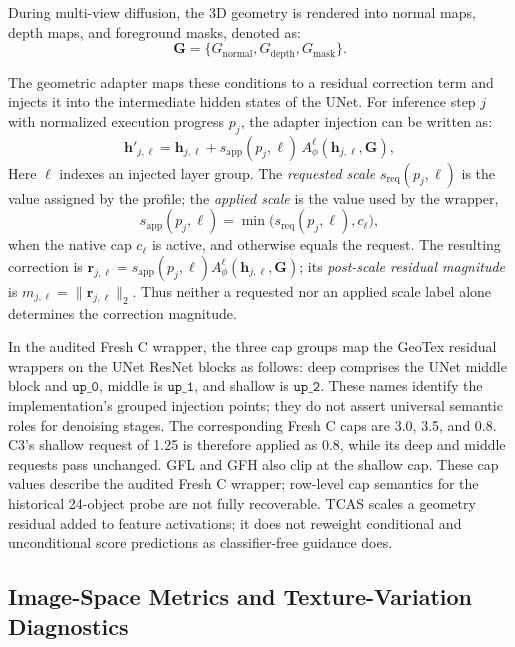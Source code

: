 \documentclass[times,twocolumn,final]{elsarticle}
\begin{document}
During multi-view diffusion, the 3D geometry is rendered into normal maps, depth maps, and foreground masks, denoted as:
\begin{equation}
\mathbf{G} = \{G_\text{normal}, G_\text{depth}, G_\text{mask}\}.
\end{equation}

The geometric adapter maps these conditions to a residual correction term and injects it into the intermediate hidden states of the UNet. For inference step $j$ with normalized execution progress $p_j$, the adapter injection can be written as:
\begin{equation}
\mathbf{h}'_{j,\ell} = \mathbf{h}_{j,\ell} + s_{\mathrm{app}}(p_j,\ell)\, A^\ell_\phi(\mathbf{h}_{j,\ell}, \mathbf{G}),
\label{eq:injection}
\end{equation}
Here $\ell$ indexes an injected layer group. The \emph{requested scale} $s_{\mathrm{req}}(p_j,\ell)$ is the value assigned by the profile; the \emph{applied scale} is the value used by the wrapper,
\begin{equation}
s_{\mathrm{app}}(p_j,\ell)=\min\!\bigl(s_{\mathrm{req}}(p_j,\ell),c_\ell\bigr),
\end{equation}
when the native cap $c_\ell$ is active, and otherwise equals the request. The resulting correction is $\mathbf{r}_{j,\ell}=s_{\mathrm{app}}(p_j,\ell)A^\ell_\phi(\mathbf{h}_{j,\ell},\mathbf{G})$; its \emph{post-scale residual magnitude} is $m_{j,\ell}=\|\mathbf{r}_{j,\ell}\|_2$. Thus neither a requested nor an applied scale label alone determines the correction magnitude.

In the audited Fresh C wrapper, the three cap groups map the GeoTex residual wrappers on the UNet ResNet blocks as follows: deep comprises the UNet middle block and $\texttt{up\_0}$, middle is $\texttt{up\_1}$, and shallow is $\texttt{up\_2}$. These names identify the implementation's grouped injection points; they do not assert universal semantic roles for denoising stages. The corresponding Fresh C caps are 3.0, 3.5, and 0.8. C3's shallow request of 1.25 is therefore applied as 0.8, while its deep and middle requests pass unchanged. GFL and GFH also clip at the shallow cap. These cap values describe the audited Fresh C wrapper; row-level cap semantics for the historical 24-object probe are not fully recoverable. TCAS scales a geometry residual added to feature activations; it does not reweight conditional and unconditional score predictions as classifier-free guidance does.

\subsection{Image-Space Metrics and Texture-Variation Diagnostics}
\label{subsec:metrics}
\end{document}
